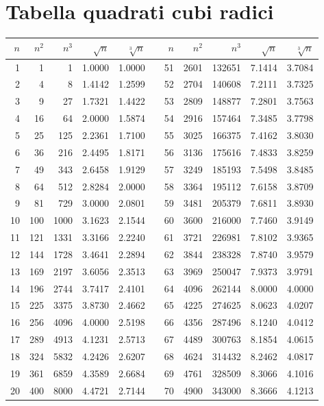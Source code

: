 
\section{Tabella quadrati cubi radici}
\label{sec:Tabellaquadraticubiradici}
	\begin{longtable}{rrrrrrrrrrr} 
	\toprule
	\bfseries $n$ &  $n^2$ & $n^3$&$\sqrt{n}$&$\sqrt[3]{n}$& &$n$ &  $n^2$ & $n^3$&$\sqrt{n}$&$\sqrt[3]{n}$  \\
	\midrule \endhead
	\bottomrule \endfoot\index{Tabella!quadrati}\index{Tabella!cubi}\index{Tabella!radici}
1&1&1&1.0000&1.0000&&51&2601&132651&7.1414&3.7084\\
2&4&8&1.4142&1.2599&&52&2704&140608&7.2111&3.7325\\
3&9&27&1.7321&1.4422&&53&2809&148877&7.2801&3.7563\\
4&16&64&2.0000&1.5874&&54&2916&157464&7.3485&3.7798\\
5&25&125&2.2361&1.7100&&55&3025&166375&7.4162&3.8030\\
6&36&216&2.4495&1.8171&&56&3136&175616&7.4833&3.8259\\
7&49&343&2.6458&1.9129&&57&3249&185193&7.5498&3.8485\\
8&64&512&2.8284&2.0000&&58&3364&195112&7.6158&3.8709\\
9&81&729&3.0000&2.0801&&59&3481&205379&7.6811&3.8930\\
10&100&1000&3.1623&2.1544&&60&3600&216000&7.7460&3.9149\\
11&121&1331&3.3166&2.2240&&61&3721&226981&7.8102&3.9365\\
12&144&1728&3.4641&2.2894&&62&3844&238328&7.8740&3.9579\\
13&169&2197&3.6056&2.3513&&63&3969&250047&7.9373&3.9791\\
14&196&2744&3.7417&2.4101&&64&4096&262144&8.0000&4.0000\\
15&225&3375&3.8730&2.4662&&65&4225&274625&8.0623&4.0207\\
16&256&4096&4.0000&2.5198&&66&4356&287496&8.1240&4.0412\\
17&289&4913&4.1231&2.5713&&67&4489&300763&8.1854&4.0615\\
18&324&5832&4.2426&2.6207&&68&4624&314432&8.2462&4.0817\\
19&361&6859&4.3589&2.6684&&69&4761&328509&8.3066&4.1016\\
20&400&8000&4.4721&2.7144&&70&4900&343000&8.3666&4.1213\\

\end{longtable}

